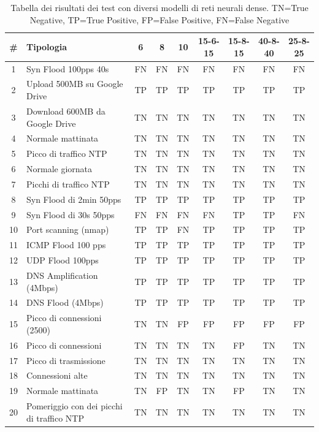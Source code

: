 \begin{table}
    \begin{tabularx}{\textwidth}{||c X c c c c c c c||} 
        \hline
        \# & Tipologia & 6 & 8 & 10 & 15-6-15 & 15-8-15 & 40-8-40 & 25-8-25\\ [0.5ex] 
        \hline\hline
        1 & Syn Flood 100pps 40s & FN & FN & FN & FN & FN & FN & FN\\ 
        \hline
        2 & Upload 500MB su Google Drive & TP & TP & TP & TP & TP & TP & TP \\ 
        \hline
        3 &  Download 600MB da Google Drive & TN  & TN & TN & TN & TN & TN & TN\\ 
        \hline 
        4 & Normale mattinata & TN & TN & TN & TN & TN & TN & TN\\
        \hline
        5 & Picco di traffico NTP & TN & TN & TN & TN & TN & TN & TN\\
        \hline
        6 & Normale giornata & TN & TN & TN & TN & TN & TN & TN\\ 
        \hline
        7 & Picchi di traffico NTP & TN & TN & TN & TN & TN & TN & TN \\ 
        \hline 
        8 & Syn Flood di 2min 50pps & TP & TP & TP & TP & TP & TP & TP\\
        \hline
        9 & Syn Flood di 30s 50pps & FN & FN & FN & FN & TP & TP & FN \\        
        \hline
        10 & Port scanning (nmap) & TP & TP & FN & TP & TP & TP & TP  \\
        \hline
        11 & ICMP Flood 100 pps & TP & TP & TP & TP & TP & TP & TP\\
        \hline
        12 & UDP Flood 100pps & TP & TP & TP & TP & TP & TP & TP\\ 
        \hline
        13 & DNS Amplification (4Mbps) & TP & TP & TP & TP & TP & TP & TP\\ 
        \hline 
        14 & DNS Flood (4Mbps) & TP & TP & TP & TP & TP & TP & TP\\
        \hline
        15 & Picco di connessioni (2500) & TN & TN & FP & FP & FP & FP & FP\\        
        \hline 
        16 & Picco di connessioni & TN & TN & TN & TN & FP & TN & TN\\        
        \hline
        17 & Picco di trasmissione & TN & TN & TN & TN & TN & TN & TN\\        
        \hline
        18 & Connessioni alte & TN & TN & TN & TN & TN & TN & TN\\
        \hline
        19 & Normale mattinata & TN & FP & TN & TN & FP & TN & TN\\ 
        \hline
        20 & Pomeriggio con dei picchi di traffico NTP & TN & TN & TN & TN & TN & TN & TN\\ 
        \hline
    \end{tabularx}
    \caption{Tabella dei risultati dei test con diversi modelli di reti neurali dense. TN=True Negative, TP=True Positive, FP=False Positive, FN=False Negative}
    \label{table:dense_tests}
\end{table}

